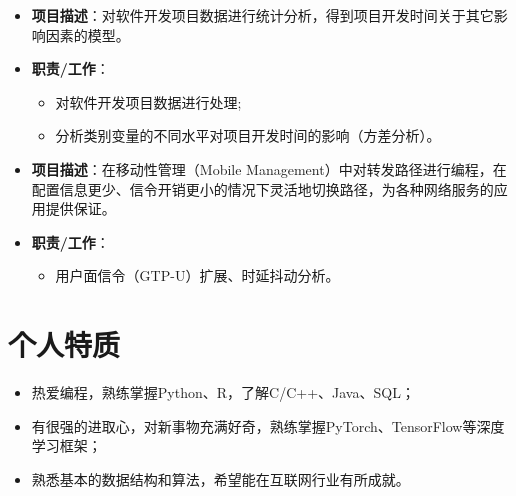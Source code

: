\documentclass{resume}
\begin{document}
\begin{itemize}[parsep=1ex]
  \item \textbf{项目描述}：对软件开发项目数据进行统计分析，得到项目开发时间关于其它影响因素的模型。
  \item \textbf{职责/工作}：
    \begin{itemize}[parsep=0.5ex]
      \item 对软件开发项目数据进行处理;
      \item 分析类别变量的不同水平对项目开发时间的影响（方差分析）。
    \end{itemize}
\end{itemize}

\begin{itemize}[parsep=1ex]
  \item \textbf{项目描述}：在移动性管理（Mobile Management）中对转发路径进行编程，在配置信息更少、信令开销更小的情况下灵活地切换路径，为各种网络服务的应用提供保证。
  \item \textbf{职责/工作}：
    \begin{itemize}[parsep=0.5ex]
      \item 用户面信令（GTP-U）扩展、时延抖动分析。
    \end{itemize}
\end{itemize}

\section{个人特质}

\begin{itemize}[parsep=1ex]
  \item{热爱编程，熟练掌握Python、R，了解C/C++、Java、SQL；}
  \item{有很强的进取心，对新事物充满好奇，熟练掌握PyTorch、TensorFlow等深度学习框架；}
  \item{熟悉基本的数据结构和算法，希望能在互联网行业有所成就。}
\end{itemize}



\end{document}
